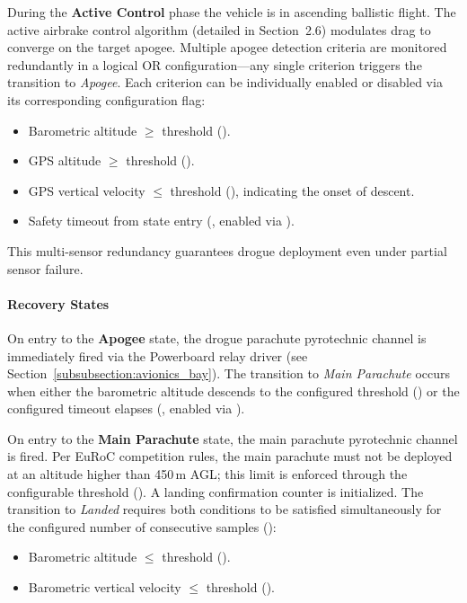 During the \textbf{Active Control} phase the vehicle is in ascending ballistic flight. The active airbrake control algorithm (detailed in Section~2.6) modulates drag to converge on the target apogee. Multiple apogee detection criteria are monitored redundantly in a logical OR configuration---any single criterion triggers the transition to \emph{Apogee}. Each criterion can be individually enabled or disabled via its corresponding configuration flag:
\begin{itemize}
    \item Barometric altitude $\geq$ threshold ().
    \item GPS altitude $\geq$ threshold ().
    \item GPS vertical velocity $\leq$ threshold (), indicating the onset of descent.
    \item Safety timeout from state entry (, enabled via ).
\end{itemize}
This multi-sensor redundancy guarantees drogue deployment even under partial sensor failure.

\paragraph{Recovery States}

On entry to the \textbf{Apogee} state, the drogue parachute pyrotechnic channel is immediately fired via the Powerboard relay driver (see Section~\ref{subsubsection:avionics_bay}). The transition to \emph{Main Parachute} occurs when either the barometric altitude descends to the configured threshold () or the configured timeout elapses (, enabled via ).

On entry to the \textbf{Main Parachute} state, the main parachute pyrotechnic channel is fired. Per EuRoC competition rules, the main parachute must not be deployed at an altitude higher than 450\,m AGL; this limit is enforced through the configurable threshold (). A landing confirmation counter is initialized. The transition to \emph{Landed} requires both conditions to be satisfied simultaneously for the configured number of consecutive samples ():
\begin{itemize}
    \item Barometric altitude $\leq$ threshold ().
    \item Barometric vertical velocity $\leq$ threshold ().
\end{itemize}

